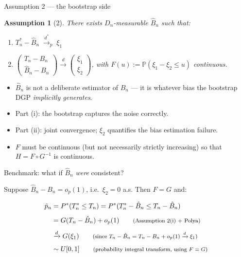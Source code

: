 \documentclass[10pt,aspectratio=169]{beamer}
\theoremstyle{plain}
\newtheorem{assumption}{Assumption}
\newcommand{\PR}{\mathbb{P}}
\newcommand{\Pstar}{P^{*}}
\newcommand{\dto}{\xrightarrow{d}}
\newcommand{\dstarto}{\xrightarrow{d^{*}}}
\newcommand{\Tn}{T_{n}}
\newcommand{\Tns}{T_{n}^{*}}
\newcommand{\Bn}{B_{n}}
\newcommand{\Bnh}{\hat{B}_{n}}
\newcommand{\pnh}{\hat{p}_{n}}
\newcommand{\Dn}{D_{n}}
\begin{document}
\begin{frame}{Assumption 2 --- the bootstrap side}

  \begin{assumption}[2]
    There exists $\Dn$-measurable $\Bnh$ such that:
    \begin{enumerate}
      \item[(i)] $\Tns - \Bnh \;\dstarto_p\; \xi_1$
      \item[(ii)] $\displaystyle \begin{pmatrix}\Tn - \Bn \\ \Bnh - \Bn\end{pmatrix}
                  \dto \begin{pmatrix}\xi_1 \\ \xi_2\end{pmatrix}$, \;with
                  $F(u) := \PR(\xi_1 - \xi_2 \le u)$ continuous.
    \end{enumerate}
  \end{assumption}

  \bigskip

  \begin{itemize}
    \setlength{\itemsep}{6pt}
    \item $\Bnh$ is \alert{not} a deliberate estimator of $\Bn$ --- it is whatever bias the
      bootstrap DGP \textit{implicitly generates}.
    \item Part (i): the bootstrap captures the noise correctly.
    \item Part (ii): joint convergence; \alert{$\xi_2$ quantifies the bias estimation failure}.
    \item $F$ must be continuous (but not necessarily strictly increasing) so that $H = F \circ G^{-1}$ is continuous.
  \end{itemize}

\end{frame}


\begin{frame}{Benchmark: what if $\Bnh$ \textit{were} consistent?}

  Suppose $\Bnh - \Bn = o_p(1)$, i.e.\ $\xi_2 = 0$ a.s. Then $F = G$ and:

  \bigskip

  \begin{align*}
    \pnh &= \Pstar(\Tns \le \Tn)
         = \Pstar(\Tns - \Bnh \le \Tn - \Bnh) \\[4pt]
    &= G(\Tn - \Bnh) + o_p(1)
    \qquad\text{\footnotesize(Assumption 2(i) + Polya)} \\[4pt]
    &\dto G(\xi_1)
    \qquad\text{\footnotesize(since $\Tn - \Bnh = \Tn - \Bn + o_p(1) \dto \xi_1$)} \\[4pt]
    &\sim U[0,1]
    \qquad\text{\footnotesize(probability integral transform, using $F = G$)}
  \end{align*}


\end{frame}
\end{document}
